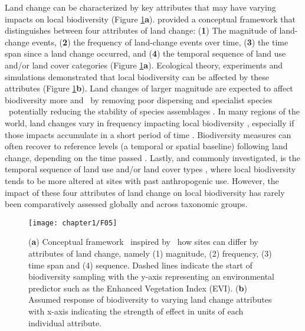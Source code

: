 Land change can be characterized by key attributes that may have varying impacts on local biodiversity (Figure \ref{F01_05}\textbf{a}). \cite{Watson2014} provided a conceptual framework that distinguishes between four attributes of land change: (\textbf{1}) The magnitude of land-change events, (\textbf{2}) the frequency of land-change events over time, (\textbf{3}) the time span since a land change occurred, and (\textbf{4}) the temporal sequence of land use and/or land cover categories (Figure \ref{F01_05}\textbf{a}). Ecological theory, experiments and simulations demonstrated that local biodiversity can be affected by these attributes (Figure \ref{F01_05}\textbf{b}). Land changes of larger magnitude are expected to affect biodiversity more \citep{Scheffer2001,Dornelas2010,Svensson2012,Ratajczak2018} and \textendash\ by removing poor dispersing \citep{Tilman1997} and specialist species \citep{Christensen2018} \textendash\ potentially reducing the stability of species assemblages \citep{Scheffer2001,Oliver2015,Hautier2015}. In many regions of the world, land changes vary in frequency \citep{Kleyer2007} impacting local biodiversity \citep{Valtonen2013,Lawson2015}, especially if those impacts accumulate in a short period of time \citep{Essl2015,Ratajczak2018}. Biodiversity measures can often recover to reference levels (\ie a temporal or spatial baseline) following land change, depending on the time passed \citep{Chazdon2003,Laurance2011,Martin2013}. Lastly, and commonly investigated, is the temporal sequence of land use and/or land cover types \citep{Harding1998,Chazdon2003,Foster2003}, where local biodiversity tends to be more altered at sites with past anthropogenic use. However, the impact of these four attributes of land change on local biodiversity has rarely been comparatively assessed globally and across taxonomic groups.

\begin{figure}[htb]
\centering
\texttt{[image: chapter1/F05]}
\caption{ (\textbf{a}) Conceptual framework \textendash\ inspired by \cite{Watson2014} \textendash\ how sites can differ by attributes of land change, namely (1) magnitude, (2) frequency, (3) time span and (4) sequence. Dashed lines indicate the start of biodiversity sampling with the y-axis representing an environmental predictor such as the Enhanced Vegetation Index (EVI). (\textbf{b}) Assumed response of biodiversity to varying land change attributes with x-axis indicating the strength of effect in units of each individual attribute.  }
\label{F01_05}
\end{figure}

